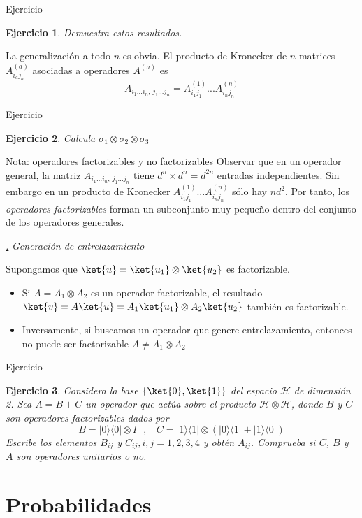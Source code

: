 \documentclass[a4paper,11pt]{book} %
\newtheorem{ejercicio_contador}{Ejercicio}
\newcommand{\Ejercicio}[1]{
		\begin{mybox_gray}{Ejercicio} 
			\begin{ejercicio_contador}
				 #1 
			\end{ejercicio_contador} 
		\end{mybox_gray}
	}
\numberwithin{equation}{chapter}
\newcommand{\ketbra}[2]{| #1\rangle \! \langle #2|}
\def\subsubiContadorIt{\par\addtocounter{subsubsection}{1}\underline{\it\thesubsubsection.}\hskip0.5cm \setcounter{subsubsubsectionIt}{0}}
\newcommand{\SubsubiIt}[1]{
		\subsubiContadorIt \textit{#1}
	}
\newcounter{subsubsubsectionIt}[subsubsection]
\begin{document}
	\Ejercicio{
	Demuestra estos resultados.
	}

La generalización a todo $n$ es obvia. El producto de Kronecker de $n$ matrices $ A^{(a)}_{i_aj_a}$ asociadas a operadores $A^{(a)}$ es
	\begin{equation}
	 A_{i_1...i_n,\,j_1...j_n} = A^{(1)}_{i_1j_1}...A^{(n)}_{i_n j_n} 
	\end{equation}

	\Ejercicio{
	Calcula $\sigma_1\otimes \sigma_2\otimes \sigma_3$
	}

\begin{mybox_blue}{Nota: operadores factorizables y no factorizables}
Observar que en un operador general, la matriz $ A_{i_1...i_n,\,j_1...j_n}$ tiene $d^n\times d^n = d^{2n}$ entradas independientes. 
Sin embargo en un producto de Kronecker $A^{(1)}_{i_1j_1}...A^{(n)}_{i_n j_n}$ sólo hay $nd^2$.     
Por tanto, los \textit{operadores factorizables} forman un subconjunto muy pequeño dentro del conjunto de los operadores generales.
\end{mybox_blue}

			\SubsubiIt{Generación de entrelazamiento}


Supongamos que $\ket{u} = \ket{u_1}\otimes\ket{u_2}$ es factorizable. 
\begin{itemize}
	\item Si $A=A_1\otimes A_2$ es un operador factorizable, el resultado $\ket{v} = A\ket{u} = A_1\ket{u_1}\otimes A_2\ket{u_2}$ también es factorizable.
	\item Inversamente, si buscamos un operador que genere entrelazamiento, entonces no puede ser factorizable $A\neq A_1\otimes A_2$
\end{itemize}

		
	\Ejercicio{
	 Considera la base $\{\ket{0},\ket{1} \}$ del espacio $\mathcal{H}$ de dimensión 2. Sea $A= B + C$ un operador que actúa sobre el producto $\mathcal{H}\otimes \mathcal{H}$,  donde $B$ y $C$ son operadores factorizables dados por  
\begin{equation}
B = \ketbra{0}{0}\otimes I ~~~, ~~~~ 
C = \ketbra{1}{1}\otimes (\ketbra{0}{1} + \ketbra{1}{0})
\end{equation} 
Escribe los elementos $B_{ij}$ y $C_{ij}, i,j=1,2,3,4$  y obtén $A_{ij}$. Comprueba si $C$, $B$ y $A$ son operadores unitarios o no.
	}


	
	\section{Probabilidades}
\end{document}
